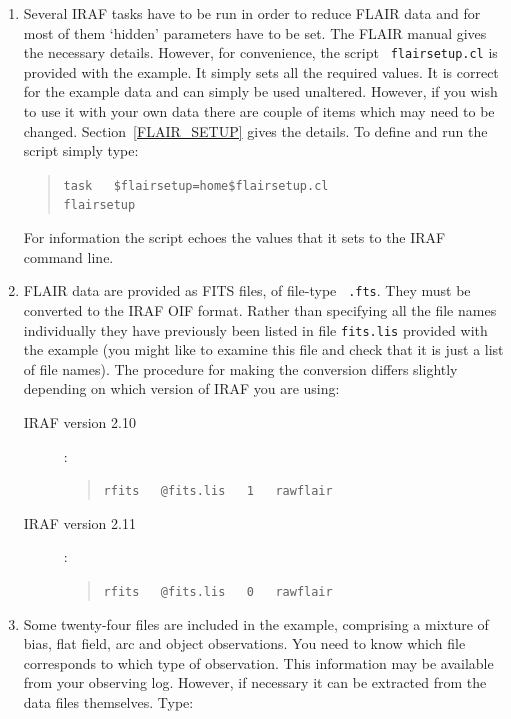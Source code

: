 \documentclass[twoside,11pt]{article}
\begin{document}
\begin{enumerate}
  \item Several IRAF tasks have to be run in order to reduce
   FLAIR data and for most of them `hidden' parameters have
   to be set.  The FLAIR manual\cite{DRINK96} gives the
   necessary details.  However, for convenience, the script {\tt
   flairsetup.cl} is provided with the example.  It simply sets
   all the required values.  It is correct for the example
   data and can simply be used unaltered.  However, if you wish
   to use it with your own data there are couple of items which
   may need to be changed.  Section~\ref{FLAIR_SETUP} gives the
   details.  To define and run the script simply type:

  \begin{quote}
   {\tt task ~ \$flairsetup=home\$flairsetup.cl \\
   flairsetup}
  \end{quote}

   For information the script echoes the values that it sets
   to the IRAF command line.

  \item FLAIR data are provided as FITS files, of file-type {\tt
   .fts}.  They must be converted to the IRAF OIF format.
   Rather than specifying all the file names individually they
   have previously been listed in file {\tt fits.lis} provided
   with the example (you might like to examine this file and
   check that it is just a list of file names).  The procedure
   for making the conversion differs slightly depending on
   which version of IRAF you are using:

  \begin{description}

    \item[IRAF version 2.10]: ~

    \begin{quote}
     {\tt rfits ~ @fits.lis ~ 1 ~ rawflair}
    \end{quote}

    \item[IRAF version 2.11]: ~

    \begin{quote}
     {\tt rfits ~ @fits.lis ~ 0 ~ rawflair}
    \end{quote}

  \end{description}

  \item Some twenty-four files are included in the example,
   comprising a mixture of bias, flat field, arc and object observations.
   You need to know which file corresponds to which type of
   observation.  This information may be available from your
   observing log.  However, if necessary it can be extracted
   from the data files themselves.  Type:


\end{enumerate}
\end{document}
